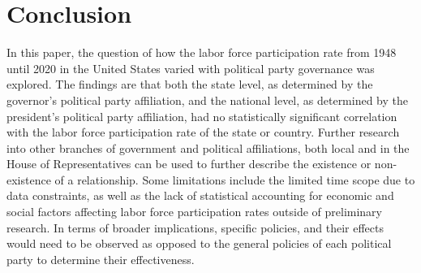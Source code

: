 \chapter{Conclusion}

In this paper, the question of how the labor force participation rate from 1948 until 2020 in the United States varied with political party governance was explored. The findings are that both the state level, as determined by the governor's political party affiliation, and the national level, as determined by the president's political party affiliation, had no statistically significant correlation with the labor force participation rate of the state or country. Further research into other branches of government and political affiliations, both local and in the House of Representatives can be used to further describe the existence or non-existence of a relationship. Some limitations include the limited time scope due to data constraints, as well as the lack of statistical accounting for economic and social factors affecting labor force participation rates outside of preliminary research. In terms of broader implications, specific policies, and their effects would need to be observed as opposed to the general policies of each political party to determine their effectiveness.